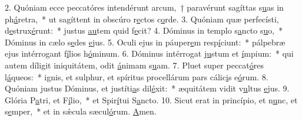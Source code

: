 2. Quóniam ecce peccatóres intendérunt arcum,~† paravérunt sagíttas s\uline{u}as in ph\uline{á}retra,~* ut sagíttent in obscúro r\uline{e}ctos c\uline{o}rde.
3. Quóniam quæ perfecísti, d\uline{e}strux\uline{é}runt:~* justus \uline{au}tem quid f\uline{e}cit?
4. Dóminus in templo s\uline{a}ncto s\uline{u}o,~* Dóminus in cælo s\uline{e}des \uline{e}jus.
5. Oculi ejus in páuper\uline{e}m resp\uline{í}ciunt:~* pálpebræ ejus intérrogant f\uline{í}lios h\uline{ó}minum.
6. Dóminus intérrogat j\uline{u}stum et \uline{í}mpium:~* qui autem díligit iniquitátem, odit \uline{á}nimam s\uline{u}am.
7. Pluet super peccat\uline{ó}res l\uline{á}queos:~* ignis, et sulphur, et spíritus procellárum pars cálic\uline{i}s e\uline{ó}rum.
8. Quóniam justus Dóminus, et justíti\uline{a}s dil\uline{é}xit:~* æquitátem vidit v\uline{u}ltus \uline{e}jus.
9. Glória P\uline{a}tri, et F\uline{í}lio,~* et Spir\uline{í}tui S\uline{a}ncto.
10. Sicut erat in princípio, et n\uline{u}nc, et s\uline{e}mper,~* et in sǽcula sæcul\uline{ó}rum. \uline{A}men.

